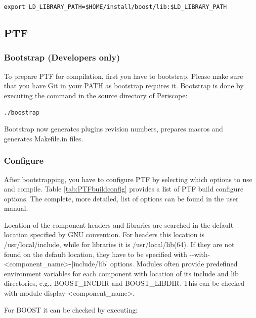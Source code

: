 \documentclass[11pt,a4paper, oneside]{book} %
\newcommand{\installloc}[1]{\$HOME/install/#1}
\newcommand{\ptfbrackets}[1]{\textless #1\textgreater}
\begin{document}
\texttt{export LD\_LIBRARY\_PATH=\installloc{boost/lib}:\$LD\_LIBRARY\_PATH}

%
%
%

\subsection{PTF}
\subsubsection{Bootstrap (Developers only)}
To prepare PTF for compilation, first you have to bootstrap. Please make sure
that you have Git in your PATH as bootstrap requires it. Bootstrap is done by
executing the command in the source directory of Periscope:

\texttt{./boostrap}

Bootstrap now generates plugins revision numbers, prepares macros and generates
Makefile.in files.

\subsubsection{Configure}
After bootstrapping, you have to configure PTF by selecting which options to
use and compile. Table \ref{tab:PTFbuildconfig} provides a list of PTF build
configure options. The complete, more detailed, list of options can be found in
the user manual.

Location of the component headers and libraries are searched in the default
location specified by GNU convention. For headers this location is
/usr/local/include, while for libraries it is /usr/local/lib(64).
If they are not found on the default location, they have to be specified with
-{}-with-\ptfbrackets{component\_name}-[include/lib] options.
Modules often provide predefined environment variables for each component with
location of its include and lib directories, e.g., BOOST\_INCDIR and
BOOST\_LIBDIR.
This can be checked with module display \ptfbrackets{component\_name}.

For BOOST it can be checked by executing:
\end{document}
